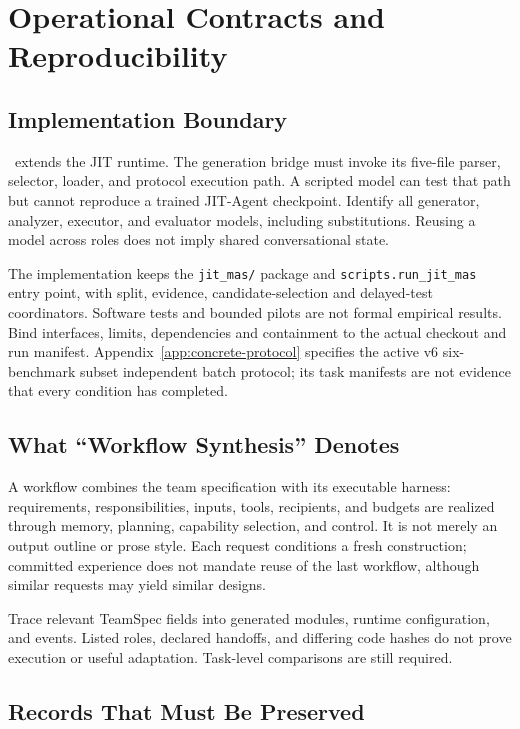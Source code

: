 \section{Operational Contracts and Reproducibility}
\label{app:reporting}

\subsection{Implementation Boundary}

\method\ extends the JIT runtime. The generation bridge must invoke its five-file parser, selector, loader, and protocol execution path. A scripted model can test that path but cannot reproduce a trained JIT-Agent checkpoint. Identify all generator, analyzer, executor, and evaluator models, including substitutions. Reusing a model across roles does not imply shared conversational state.

The implementation keeps the \texttt{jit\_mas/} package and \texttt{scripts.run\_jit\_mas} entry point, with split, evidence, candidate-selection and delayed-test coordinators. Software tests and bounded pilots are not formal empirical results. Bind interfaces, limits, dependencies and containment to the actual checkout and run manifest. Appendix~\ref{app:concrete-protocol} specifies the active v6 six-benchmark subset independent batch protocol; its task manifests are not evidence that every condition has completed.

\subsection{What ``Workflow Synthesis'' Denotes}

A workflow combines the team specification with its executable harness: requirements, responsibilities, inputs, tools, recipients, and budgets are realized through memory, planning, capability selection, and control. It is not merely an output outline or prose style. Each request conditions a fresh construction; committed experience does not mandate reuse of the last workflow, although similar requests may yield similar designs.

Trace relevant TeamSpec fields into generated modules, runtime configuration, and events. Listed roles, declared handoffs, and differing code hashes do not prove execution or useful adaptation. Task-level comparisons are still required.

\subsection{Records That Must Be Preserved}

